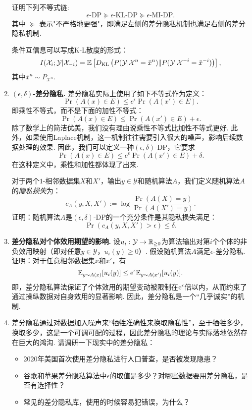 \begin{enumerate}[wide, labelindent=0pt]
    证明下列不等式链:
    \[
        \epsilon\text{-DP} \succeq \epsilon\text{-KL-DP} \succeq \epsilon\text{-MI-DP}.
    \]
    其中 $\succeq$ 表示"不严格地更强"，即满足左侧的差分隐私机制也满足右侧的差分隐私机制.
    \begin{hint}
        条件互信息可以写成K-L散度的形式：
            \[
                I(\mathcal X_{i};\mathcal Y|\mathcal X_{-i}) = \mathbb{E} \left[D_{\mathrm{KL}}\left(P(\mathcal Y|\mathcal X^{n}=\bar{x}^n)\Vert P(\mathcal Y|\mathcal X^{-i}=\bar{x}^{-i})\right)\right],
            \]
            其中$\bar{x}^n \sim P_{\mathcal X^n}$.
    \end{hint}

    \item \label{exercise:eps-delta-DP}\textbf{$(\epsilon,\delta)$-差分隐私. }差分隐私实际上使用了如下不等式作为定义：
    \[\Pr(A(x)\in E) \leq e^{\epsilon} \Pr(A(x') \in E).\]
    即乘性不等式，而不是下面的加性不等式：
    \[\Pr(A(x)\in E) \leq \Pr(A(x') \in E) + \epsilon.\]
    除了数学上的简洁优美，我们没有理由说乘性不等式比加性不等式更好. 此外，如果使用Laplace机制，这一机制往往需要引入很大的噪声，影响后续数据处理的效果. 因此，我们可以定义一种$(\epsilon, \delta)$-DP，它要求
    \[
    \Pr(A(x)\in E) \leq e^{\epsilon} \Pr(A(x') \in E) + \delta.
    \]
    在这种定义中，乘性和加性都体现了出来. 
    
    对于两个$1$-相邻数据集$X$和$X'$，输出$y \in \mathcal Y$和随机算法$A$，我们定义随机算法$A$的\textit{隐私损失}为：
    \[
        c_A(y,  X, X') := \log \frac{\Pr(A( X) = y)}{\Pr(A( X') = y)}.
    \]
    证明：随机算法$A$是$(\epsilon, \delta)$-DP的一个充分条件是其隐私损失满足：
    \[
        \Pr(c_A(y,  X,  X') > \epsilon) \leq \delta.
    \]

    \item \textbf{差分隐私对个体效用期望的影响. }设$u_i: \mathcal{Y} \to \mathbb{R}_{\geq 0}$为算法输出对第$i$个个体的非负效用映射（即对任意$y \in \mathcal{Y}$，$u_i(y) \geq 0$）. 假设随机算法$A$满足$\epsilon$-差分隐私. 证明：对于任意相邻数据集$x$和$x'$，有  
    \[
    \mathbb{E}_{y \sim A(x)}[u_i(y)] \leq \mathrm{e}^{\epsilon} \mathbb{E}_{y \sim A(x')}[u_i(y)].
    \]  
    即，差分隐私算法保证了个体效用的期望变动被限制在$\mathrm{e}^{\epsilon}$倍以内，从而约束了通过操纵数据对自身效用的显著影响. 因此，差分隐私是一个“几乎诚实”的机制. 

    \item 差分隐私通过对数据加入噪声来“牺牲准确性来换取隐私性”，至于牺牲多少，换取多少，这是一个可调可配的过程，因此差分隐私的理论与实际落地依然存在巨大的鸿沟. 请调研一下现实中的差分隐私：
    \begin{itemize}
        \item 2020年美国首次使用差分隐私进行人口普查，是否被发现隐患？
        \item 谷歌和苹果差分隐私算法中$\epsilon$的取值是多少？对哪些数据要用差分隐私，是否有选择性？
        \item 常见的差分隐私库，使用的时候容易犯错误，为什么？
    \end{itemize}

\end{enumerate}